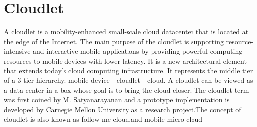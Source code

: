 \section{Cloudlet}


A cloudlet is a mobility-enhanced small-scale cloud datacenter that is located 
at the edge of the Internet. The main purpose of the cloudlet is supporting 
resource-intensive and interactive mobile applications by providing powerful 
computing resources to mobile devices with lower latency. It is a new 
architectural element that extends today’s cloud computing infrastructure. 
It represents the middle tier of a 3-tier hierarchy: mobile device - cloudlet 
- cloud. A cloudlet can be viewed as a data center in a box whose goal is to 
bring the cloud closer. The cloudlet term was first coined by M. Satyanarayanan 
and a prototype implementation is developed by Carnegie Mellon University as a 
research project.The concept of cloudlet is also known as follow me cloud,and 
mobile micro-cloud \cite{wikiCloudlet}
